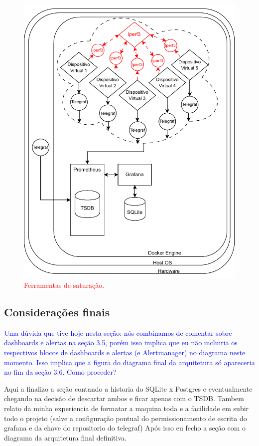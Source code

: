 {\begin{figure}[H]
\centering
\includegraphics[scale=1]{Imagens/chap03/by-blocks/saturation_diagram.pdf}
\caption{\textcolor{red}{Ferramentas de saturação.}}
\label{fig:DiagramaSaturacao}
\end{figure}


\subsection{Considerações finais}
\label{subsection:ConsideracoesFinais}

\textcolor{blue}{Uma dúvida que tive hoje nesta seção: nós combinamos de comentar sobre dashboards e alertas na seção 3.5, porém isso implica que eu não incluiria os respectivos blocos de dashboards e alertas (e Alertmanager) no diagrama neste momento. Isso implica que a figura do diagrama final da arquitetura só apareceria no fim da seção 3.6. Como proceder?}

Aqui a finalizo a seção contando a historia do SQLite x Postgres e eventualmente chegando na decisão de descartar ambos e ficar apenas com o TSDB.
Tambem relato da minha experiencia de formatar a maquina toda e a facilidade em subir todo o projeto (salve a configuração pontual do permissionamento de escrita do grafana e da chave do repositorio do telegraf)
Após isso eu fecho a seção com o diagrama da arquitetura final definitiva. 
}

